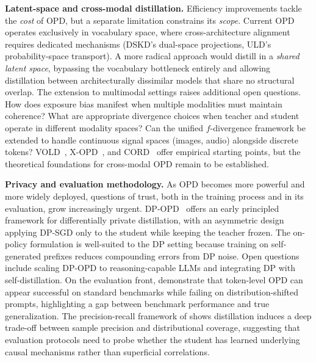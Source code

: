 \documentclass{article} %
\begin{document}
\textbf{Latent-space and cross-modal distillation.} Efficiency improvements tackle the \emph{cost} of OPD, but a separate limitation constrains its \emph{scope}. Current OPD operates exclusively in vocabulary space, where cross-architecture alignment requires dedicated mechanisms (DSKD's dual-space projections, ULD's probability-space transport). A more radical approach would distill in a \emph{shared latent space}, bypassing the vocabulary bottleneck entirely and allowing distillation between architecturally dissimilar models that share no structural overlap. The extension to multimodal settings raises additional open questions. How does exposure bias manifest when multiple modalities must maintain coherence? What are appropriate divergence choices when teacher and student operate in different modality spaces? Can the unified $f$-divergence framework be extended to handle continuous signal spaces (images, audio) alongside discrete tokens? VOLD~\citep{2510.23497}, X-OPD~\citep{2603.24596}, and CORD~\citep{2601.16547} offer empirical starting points, but the theoretical foundations for cross-modal OPD remain to be established.

\textbf{Privacy and evaluation methodology.} As OPD becomes more powerful and more widely deployed, questions of trust, both in the training process and in its evaluation, grow increasingly urgent. DP-OPD~\citep{2604.04461} offers an early principled framework for differentially private distillation, with an asymmetric design applying DP-SGD only to the student while keeping the teacher frozen. The on-policy formulation is well-suited to the DP setting because training on self-generated prefixes reduces compounding errors from DP noise. Open questions include scaling DP-OPD to reasoning-capable LLMs and integrating DP with self-distillation. On the evaluation front, \citet{2603.25562} demonstrate that token-level OPD can appear successful on standard benchmarks while failing on distribution-shifted prompts, highlighting a gap between benchmark performance and true generalization. The precision-recall framework of \citet{2505.13111} shows distillation induces a deep trade-off between sample precision and distributional coverage, suggesting that evaluation protocols need to probe whether the student has learned underlying causal mechanisms rather than superficial correlations.
\end{document}
